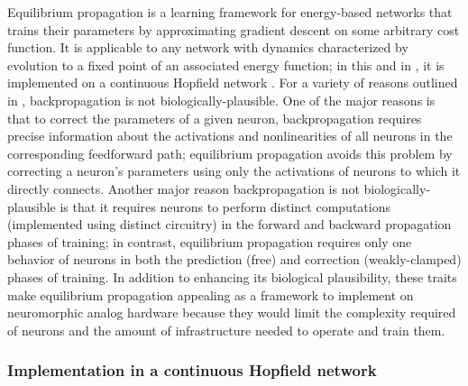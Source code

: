 \documentclass[format=sigconf]{acmart}
\begin{document}
Equilibrium propagation \cite{scellier17} is a learning framework for energy-based networks that trains their parameters by approximating gradient descent on some arbitrary cost function. It is applicable to any network with dynamics characterized by evolution to a fixed point of an associated energy function; in this and in \cite{scellier17}, it is implemented on a continuous Hopfield network \cite{hopfield1984}. For a variety of reasons outlined in \cite{bengio2015}, backpropagation is not biologically-plausible. One of the major reasons is that to correct the parameters of a given neuron, backpropagation requires precise information about the activations and nonlinearities of all neurons in the corresponding feedforward path; equilibrium propagation avoids this problem by correcting a neuron's parameters using only the activations of neurons to which it directly connects. Another major reason backpropagation is not biologically-plausible is that it requires neurons to perform distinct computations (implemented using distinct circuitry) in the forward and backward propagation phases of training; in contrast, equilibrium propagation requires only one behavior of neurons in both the prediction (free) and correction (weakly-clamped) phases of training. In addition to enhancing its biological plausibility, these traits make equilibrium propagation appealing as a framework to implement on neuromorphic analog hardware because they would limit the complexity required of neurons and the amount of infrastructure needed to operate and train them.

\subsubsection{Implementation in a continuous Hopfield network}
\end{document}
